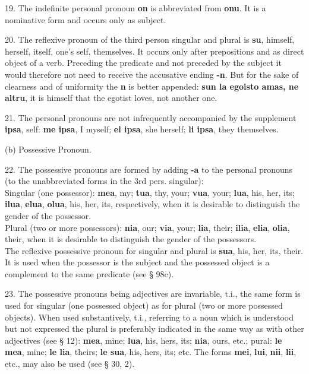 19. The indefinite personal pronoun \textbf{on} is abbreviated from \textbf{onu}. It is a nominative form and occurs only as subject. 

20. The reflexive pronoun of the third person singular and plural is \textbf{su}, himself, herself, itself, one's self, themselves. It occurs only after prepositions and as direct object of a verb. Preceding the predicate and not preceded by the subject it would therefore not need to receive the accusative ending \textbf{-n}. But for the sake of clearness and of uniformity the \textbf{n} is better appended: \textbf{sun la egoisto amas, ne altru}, it is himself that the egotist loves, not another one. 

21. The personal pronouns are not infrequently accompanied by the supplement \textbf{ipsa}, self: \textbf{me ipsa}, I myself; \textbf{el ipsa}, she herself; \textbf{li ipsa}, they themselves.

\Centering (b) Possessive Pronoun. \\ \justifying

22. The possessive pronouns are formed by adding \textbf{-a} to the personal pronouns (to the unabbreviated forms in the 3rd pers. singular): \\
Singular (one possessor): \textbf{mea}, my; \textbf{tua}, thy, your; \textbf{vua}, your; \textbf{lua}, his, her, its; \textbf{ilua}, \textbf{elua}, \textbf{olua}, his, her, its, respectively, when it is desirable to distinguish the gender of the possessor. \\
Plural (two or more possessors): \textbf{nia}, our; \textbf{via}, your; \textbf{lia}, their; \textbf{ilia}, \textbf{elia}, \textbf{olia}, their, when it is desirable to distinguish the gender of the possessors. \\
The reflexive possessive pronoun for singular and plural is \textbf{sua}, his, her, its, their. It is used when the possessor is the subject and the possessed object is a complement to the same predicate (see § 98c). 

23. The possessive pronouns being adjectives are invariable, t.i., the same form is used for singular (one possessed object) as for plural (two or more possessed objects). When used substantively, t.i., referring to a noun which is understood but not expressed the plural is preferably indicated in the same way as with other adjectives (see § 12): \textbf{mea}, mine; \textbf{lua}, his, hers, its; \textbf{nia}, ours, etc.; pural: \textbf{le mea}, mine; \textbf{le lia}, theirs; \textbf{le sua}, his, hers, its; etc. The forms \textbf{mei}, \textbf{lui}, \textbf{nii}, \textbf{lii}, etc., may also be used (see § 30, 2).

